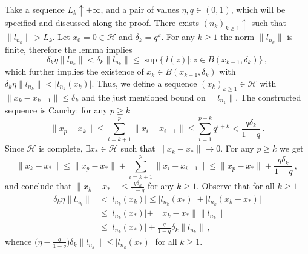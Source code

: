 \documentclass[a4paper]{article}
\newcommand{\Hcal}{\mathcal{H}}
\begin{document}
Take a sequence $L_k \uparrow +\infty$, and a pair of values $\eta, q \in (0, 1)$,
which will be specified and discussed along the proof. There exists $(n_k)_{k\geq1}
\uparrow$ such that $\|l_{n_k}\| > L_k$. Let $x_0 = 0 \in \Hcal$ and $\delta_k = q^k$.
For any $k\geq 1$ the norm $\|l_{n_k} \|$ is finite, therefore the lemma implies
\begin{equation*}
  \delta_k \eta \|l_{n_k}\|
    < \delta_k \|l_{n_k}\|
    \leq \sup\{\lvert l(z) \rvert \colon z\in B(x_{k-1}, \delta_k)\}
      \,,
\end{equation*}
which further implies the existence of $x_k \in B(x_{k-1}, \delta_k)$ with $\delta_k
\eta \|l_{n_k}\| < \lvert l_{n_k}(x_k) \rvert$. Thus, we define a sequence $(x_k)_{k\geq1}
\in \Hcal$ with $\|x_k - x_{k-1}\| \leq \delta_k$ and the just mentioned bound on
$\|l_{n_k}\|$. The constructed sequence is Cauchy: for any $p \geq k$
\begin{equation*}
  \|x_p - x_k \|
    \leq \sum_{i=k+1}^p \|x_i - x_{i-1} \|
    \leq \sum_{i=1}^{p-k} q^{i+k}
    < \frac{q \delta_k}{1-q}
    \,.
\end{equation*}
Since $\Hcal$ is complete, $\exists x_*\in \Hcal$ such that $\|x_k - x_*\| \to 0$.
For any $p \geq k$ we get
\begin{equation*}
  \|x_k - x_* \|
    \leq \| x_p - x_*\| + \sum_{i=k+1}^p \|x_i - x_{i-1} \|
    \leq \| x_p - x_*\| + \frac{q \delta_k}{1-q}
    \,,
\end{equation*}
and conclude that $\|x_k - x_* \| \leq \frac{q \delta_k}{1-q}$ for any $k\geq 1$.
Observe that for all $k\geq 1$
\begin{align*}
  \delta_k \eta \|l_{n_k} \|
    &< \lvert l_{n_k}(x_k) \rvert
      \leq \lvert l_{n_k}(x_*) \rvert
        + \lvert l_{n_k}(x_k - x_*) \rvert
    \\
    &\leq \lvert l_{n_k}(x_*) \rvert
      + \|x_k - x_*\| \|l_{n_k}\|
    \\
    &\leq \lvert l_{n_k}(x_*) \rvert
      + \tfrac{q}{1-q} \delta_k \|l_{n_k}\|
      \,,
\end{align*}
whence $\bigl(\eta - \tfrac{q}{1-q} \bigr) \delta_k \|l_{n_k}\| \leq \lvert l_{n_k}(x_*) \rvert$
for all $k\geq 1$.
\end{document}
